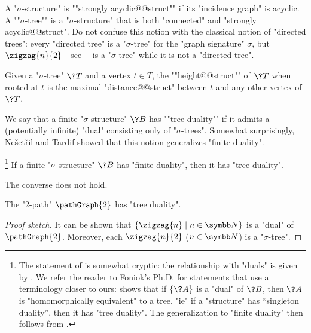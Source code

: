 A "$\sigma$-structure" is \AP""strongly acyclic@@struct"" if its "incidence graph" is acyclic.
A \AP""$\sigma$-tree"" is a "$\sigma$-structure" that is both "connected" and "strongly acyclic@@struct".
Do not confuse this notion with the classical notion of "directed trees":
every "directed tree" is a "$\sigma$-tree" for the "graph signature" $\sigma$,
but $\zigzag{n}{2}$---see ---is a "$\sigma$-tree"
while it is not a "directed tree". 

Given a "$\sigma$-tree" $\?T$ and a vertex $t\in T$, the \AP""height@@struct"" of $\?T$
when rooted at $t$ is the maximal "distance@@struct" between $t$ and any other vertex of $\?T$.

We say that a finite "$\sigma$-structure" $\?B$ has \AP""tree duality""
if it admits a (potentially infinite) "dual" consisting only of "$\sigma$-trees".
Somewhat surprisingly, Ne\v{s}et\v{r}il and Tardif showed that
this notion generalizes "finite duality".

\begin{proposition}
	\!\footnote{The statement of \cite[Theorem~3.1]{NesetrilTardif2000DualityTheorems}
	is somewhat cryptic: the relationship with "duals" is given by
	\cite[Lemma~2.5]{NesetrilTardif2000DualityTheorems}.
	We refer the reader to Foniok's Ph.D. for statements that use a terminology closer to ours:
	\cite[Theorem~2.1.12]{Foniok2007PhD} shows that if $\{\?A\}$ is a "dual" of $\?B$,
	then $\?A$ is "homomorphically equivalent" to a tree, "ie" if a "structure" has
	``singleton duality'', then it has "tree duality".
	The generalization to "finite duality" then follows from
	\cite[Theorem~2.4.4]{Foniok2007PhD}.}
	\AP\label{prop:finite-duality-implies-tree-duality}
	If a finite "$\sigma$-structure" $\?B$ has "finite duality",
	then it has "tree duality".
\end{proposition}

The converse does not hold.
\begin{proposition}
	\AP\label{prop:2-path-tree-duality}
	The "$2$-path" $\pathGraph{2}$ has "tree duality".
\end{proposition}

\begin{proof}[Proof sketch]
	It can be shown that $\{\zigzag{n} \mid n\in\N\}$ is a "dual" of
	$\pathGraph{2}$. Moreover, each $\zigzag{n}{2}$ ($n\in\N$) is a "$\sigma$-tree".
\end{proof}


